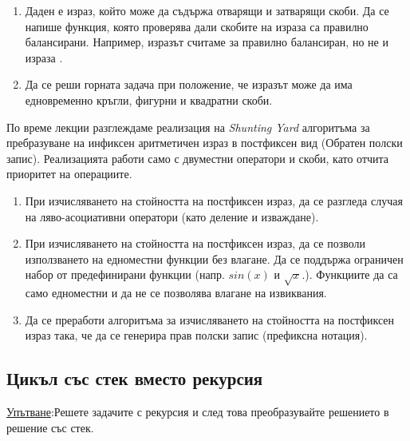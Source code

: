 \begin{enumerate}[resume]
  \item Даден е израз, който може да съдържа отварящи и затварящи скоби.  Да се напише функция, която проверява дали скобите на израза са  правилно балансирани. Например, изразът  считаме за правилно балансиран, но не и израза .
  \item Да се реши горната задача при положение, че изразът може да има едновременно кръгли, фигурни и квадратни скоби.

\end{enumerate}


\begin{mdframed}[hidealllines=true,backgroundcolor=gray!20]
  По време лекции разглеждаме реализация на \emph{Shunting Yard} алгоритъма за пребразуване на инфиксен аритметичен израз в постфиксен вид (Обратен полски запис). Реализацията работи само с двуместни оператори и скоби, като отчита приоритет на операциите.
\end{mdframed}

\begin{enumerate}[resume]
  \item При изчисляването на стойността на постфиксен израз, да се разгледа случая на ляво-асоциативни оператори (като деление и изваждане).
  \item При изчисляването на стойността на постфиксен израз, да се позволи използването на едноместни функции без влагане. Да се поддържа ограничен набор от предефинирани функции (напр. $sin(x)$ и $\sqrt{x}$.). Функциите да са само едноместни и да не се позволява влагане на извиквания.
  \item Да се преработи алгоритъма за изчисляването на стойността на постфиксен израз така, че да се генерира прав полски запис (префиксна нотация).
\end{enumerate}

\subsection {Цикъл със стек вместо рекурсия}

\underline{Упътване}:Решете задачите с рекурсия и след това преобразувайте решението в решение със стек.


